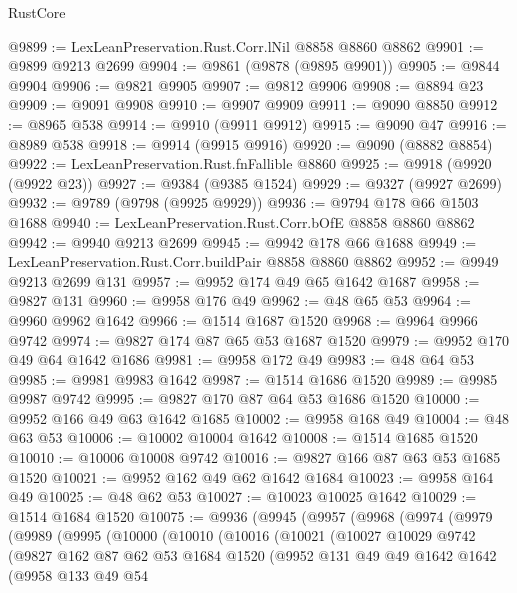 \begin{lexlean}{RustCore}
\begin{coremodule}
@9899 := LexLeanPreservation.Rust.Corr.lNil @8858 @8860 @8862
@9901 := @9899 @9213 @2699
@9904 := @9861 (@9878 (@9895 @9901))
@9905 := @9844 @9904
@9906 := @9821 @9905
@9907 := @9812 @9906
@9908 := @8894 @23
@9909 := @9091 @9908
@9910 := @9907 @9909
@9911 := @9090 @8850
@9912 := @8965 @538
@9914 := @9910 (@9911 @9912)
@9915 := @9090 @47
@9916 := @8989 @538
@9918 := @9914 (@9915 @9916)
@9920 := @9090 (@8882 @8854)
@9922 := LexLeanPreservation.Rust.fnFallible @8860
@9925 := @9918 (@9920 (@9922 @23))
@9927 := @9384 (@9385 @1524)
@9929 := @9327 (@9927 @2699)
@9932 := @9789 (@9798 (@9925 @9929))
@9936 := @9794 @178 @66 @1503 @1688
@9940 := LexLeanPreservation.Rust.Corr.bOfE @8858 @8860 @8862
@9942 := @9940 @9213 @2699
@9945 := @9942 @178 @66 @1688
@9949 := LexLeanPreservation.Rust.Corr.buildPair @8858 @8860 @8862
@9952 := @9949 @9213 @2699 @131
@9957 := @9952 @174 @49 @65 @1642 @1687
@9958 := @9827 @131
@9960 := @9958 @176 @49
@9962 := @48 @65 @53
@9964 := @9960 @9962 @1642
@9966 := @1514 @1687 @1520
@9968 := @9964 @9966 @9742
@9974 := @9827 @174 @87 @65 @53 @1687 @1520
@9979 := @9952 @170 @49 @64 @1642 @1686
@9981 := @9958 @172 @49
@9983 := @48 @64 @53
@9985 := @9981 @9983 @1642
@9987 := @1514 @1686 @1520
@9989 := @9985 @9987 @9742
@9995 := @9827 @170 @87 @64 @53 @1686 @1520
@10000 := @9952 @166 @49 @63 @1642 @1685
@10002 := @9958 @168 @49
@10004 := @48 @63 @53
@10006 := @10002 @10004 @1642
@10008 := @1514 @1685 @1520
@10010 := @10006 @10008 @9742
@10016 := @9827 @166 @87 @63 @53 @1685 @1520
@10021 := @9952 @162 @49 @62 @1642 @1684
@10023 := @9958 @164 @49
@10025 := @48 @62 @53
@10027 := @10023 @10025 @1642
@10029 := @1514 @1684 @1520
@10075 := @9936
    (@9945
      (@9957
        (@9968
          (@9974
            (@9979
              (@9989
                (@9995
                  (@10000
                    (@10010
                      (@10016
                        (@10021
                          (@10027
                            @10029
                            @9742
                            (@9827
                              @162
                              @87
                              @62
                              @53
                              @1684
                              @1520
                              (@9952
                                @131
                                @49
                                @49
                                @1642
                                @1642
                                (@9958
                                  @133
                                  @49
                                  @54

\end{coremodule}
\end{lexlean}
